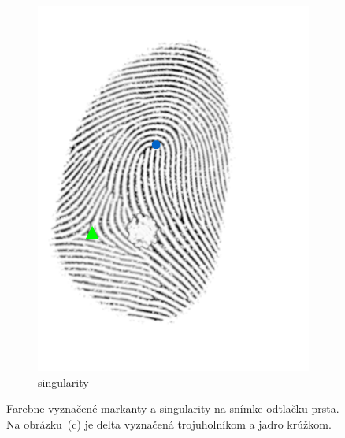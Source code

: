 \begin{figure}[h]
\begin{subfigure}[b]{0.3\linewidth}
      \includegraphics[width=\linewidth]{obrazky-figures/cores_deltas.png}
      \caption{singularity}
      \label{obr:singularity}
    \end{subfigure}
    \caption{Farebne vyznačené markanty a singularity na snímke odtlačku prsta. Na obrázku~\mbox{(c)} je delta vyznačená trojuholníkom
            a jadro krúžkom.}
    \label{obr:markanty}
  \end{figure}

